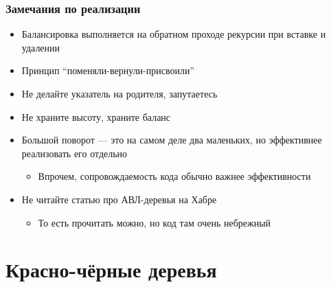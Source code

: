 \documentclass[xetex,mathserif,serif]{beamer}
\begin{document}
    \begin{frame}
        \frametitle{Замечания по реализации}
        \begin{itemize}
            \item Балансировка выполняется на обратном проходе рекурсии при вставке и удалении
            \item Принцип ``поменяли-вернули-присвоили''
            \item Не делайте указатель на родителя, запутаетесь
            \item Не храните высоту, храните баланс
            \item Большой поворот --- это на самом деле два маленьких, но эффективнее реализовать его отдельно
            \begin{itemize}
                \item Впрочем, сопровождаемость кода обычно важнее эффективности
            \end{itemize}
            \item Не читайте статью про АВЛ-деревья на Хабре
            \begin{itemize}
                \item То есть прочитать можно, но код там очень небрежный
            \end{itemize}
        \end{itemize}
    \end{frame}

    \section{Красно-чёрные деревья}
\end{document}
